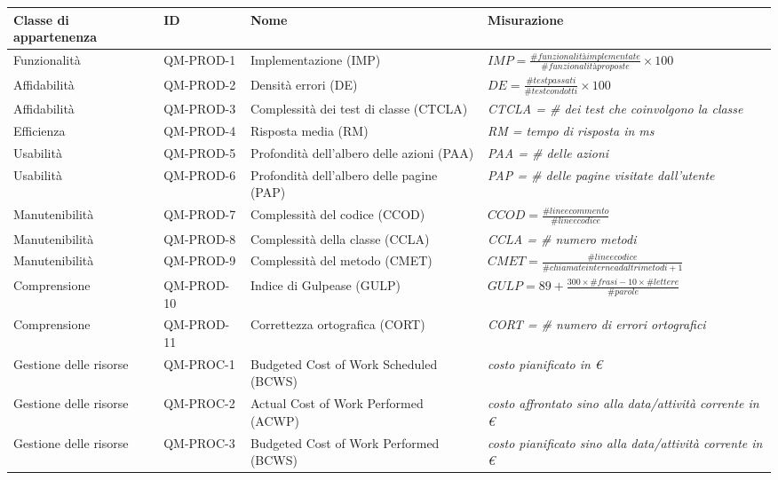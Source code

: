 	\begin{center}
		\begin{longtable}{|p{2.5cm}|p{2cm}|p{3cm}|p{7.5cm}|}
			\hline
			Classe di appartenenza & ID & Nome & Misurazione \\
			\hline
			Funzionalità & QM-PROD-1 & Implementazione (IMP) & \(IMP = \frac{\# funzionalità implementate}{\# funzionalità proposte}\times100\) \\
			\hline
			Affidabilità & QM-PROD-2 & Densità errori (DE) & \(DE = \frac{\# test passati}{\# test condotti}\times100\) \\
			\hline
			Affidabilità & QM-PROD-3 & Complessità dei test di classe (CTCLA) & \textit{CTCLA = \# dei test che coinvolgono la classe} \\
			\hline
			Efficienza & QM-PROD-4 & Risposta media (RM) & \textit{RM = tempo di risposta in ms} \\
			\hline
			Usabilità & QM-PROD-5 & Profondità dell'albero delle azioni (PAA) & \textit{PAA = \# delle azioni} \\
			\hline
			Usabilità & QM-PROD-6 & Profondità dell'albero delle pagine (PAP) & \textit{PAP = \# delle pagine visitate dall'utente} \\
			\hline
			Manutenibilità & QM-PROD-7 & Complessità del codice (CCOD) & \(CCOD = \frac{\# linee commento}{\# linee codice}\) \\
			\hline
			Manutenibilità & QM-PROD-8 & Complessità della classe (CCLA) & \textit{CCLA = \# numero metodi} \\
			\hline
			Manutenibilità & QM-PROD-9 & Complessità del metodo (CMET) & \(CMET = \frac{\# linee codice}{\# chiamate interne ad altri metodi+1}\) \\
			\hline
			Comprensione & QM-PROD-10 & Indice di Gulpease (GULP) & \(GULP = 89+\frac{300\times\# frasi-10\times\#lettere}{\#parole}\) \\
			\hline
			Comprensione & QM-PROD-11 & Correttezza ortografica (CORT) & \textit{CORT = \# numero di errori ortografici} \\
			\hline
			Gestione delle risorse & QM-PROC-1 & Budgeted Cost of Work Scheduled (BCWS) & \textit{costo pianificato in \euro{}} \\
			\hline
			Gestione delle risorse & QM-PROC-2 & Actual Cost of Work Performed (ACWP) & \textit{costo affrontato sino alla data/attività corrente in \euro{}} \\
			\hline
			Gestione delle risorse & QM-PROC-3 & Budgeted Cost of Work Performed (BCWS) & \textit{costo pianificato sino alla data/attività corrente in \euro{}} \\

\end{longtable}
\end{center}
